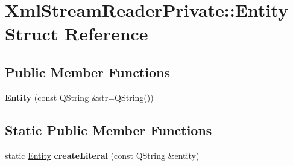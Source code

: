 \hypertarget{struct_xml_stream_reader_private_1_1_entity}{}\section{Xml\+Stream\+Reader\+Private\+:\+:Entity Struct Reference}
\label{struct_xml_stream_reader_private_1_1_entity}
\subsection*{Public Member Functions}
\begin{DoxyCompactItemize}
\item 
\mbox{\label{struct_xml_stream_reader_private_1_1_entity_a3d648f58ef9fc3ed742f52bd4f4e8ad4}} 
{\bfseries Entity} (const Q\+String \&str=Q\+String())
\end{DoxyCompactItemize}
\subsection*{Static Public Member Functions}
\begin{DoxyCompactItemize}
\item 
\mbox{\label{struct_xml_stream_reader_private_1_1_entity_afe2cf6194529d1707fc2a4092f083411}} 
static \hyperlink{struct_xml_stream_reader_private_1_1_entity}{Entity} {\bfseries create\+Literal} (const Q\+String \&entity)
\end{DoxyCompactItemize}

